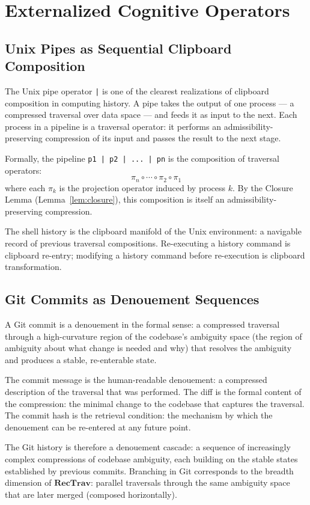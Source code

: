 \documentclass[12pt,oneside]{book}
\theoremstyle{plain}
\theoremstyle{definition}
\theoremstyle{plain}
\newcommand{\RecTrav}{\mathbf{RecTrav}}
\begin{document}
\chapter{Externalized Cognitive Operators}
\label{ch:externalized}

\section{Unix Pipes as Sequential Clipboard Composition}

The Unix pipe operator \texttt{|} is one of the clearest realizations of clipboard composition in computing history. A pipe takes the output of one process — a compressed traversal over data space — and feeds it as input to the next. Each process in a pipeline is a traversal operator: it performs an admissibility-preserving compression of its input and passes the result to the next stage.

Formally, the pipeline \texttt{p1 | p2 | ... | pn} is the composition of traversal operators:
\[
\pi_n \circ \cdots \circ \pi_2 \circ \pi_1
\]
where each $\pi_k$ is the projection operator induced by process $k$. By the Closure Lemma (Lemma~\ref{lem:closure}), this composition is itself an admissibility-preserving compression.

The shell history is the clipboard manifold of the Unix environment: a navigable record of previous traversal compositions. Re-executing a history command is clipboard re-entry; modifying a history command before re-execution is clipboard transformation.

\section{Git Commits as Denouement Sequences}

A Git commit is a denouement in the formal sense: a compressed traversal through a high-curvature region of the codebase's ambiguity space (the region of ambiguity about what change is needed and why) that resolves the ambiguity and produces a stable, re-enterable state.

The commit message is the human-readable denouement: a compressed description of the traversal that was performed. The diff is the formal content of the compression: the minimal change to the codebase that captures the traversal. The commit hash is the retrieval condition: the mechanism by which the denouement can be re-entered at any future point.

The Git history is therefore a denouement cascade: a sequence of increasingly complex compressions of codebase ambiguity, each building on the stable states established by previous commits. Branching in Git corresponds to the breadth dimension of $\RecTrav$: parallel traversals through the same ambiguity space that are later merged (composed horizontally).
\end{document}
